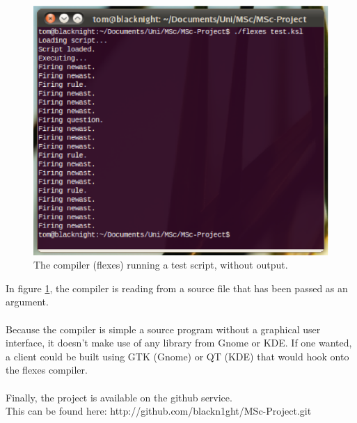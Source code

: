 \documentclass[12pt]{report}
\begin{document}
\begin{figure}[H]
	\centering
	\includegraphics[scale=0.75]{flexes}
	\caption{The compiler (flexes) running a test script, without output.}\label{fig:flexes}
\end{figure}
In figure \ref{fig:flexes}, the compiler is reading from a source file that has been passed as an argument.\\
\\
Because the compiler is simple a source program without a graphical user interface, it doesn't make use of any library from Gnome or KDE.  If one wanted, a client could be built using GTK (Gnome) or QT (KDE) that would hook onto the flexes compiler.
\\
\\
Finally, the project is available on the github service.\\This can be found here: http://github.com/blackn1ght/MSc-Project.git
\end{document}
